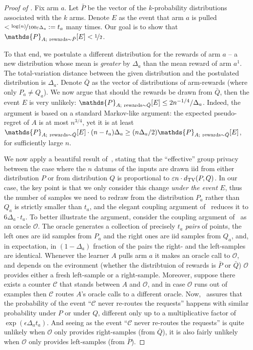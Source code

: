 \documentclass{article}
\renewcommand{\Pr}{\mathds{P}}
\begin{document}
\begin{proof}[Proof of ]
Fix arm $a$. Let $\bar P$ be the vector of the $k$-probability distributions associated with the $k$ arms. Denote $E$ as the event that arm $a$ is pulled $<\nicefrac{\log(n)}{100\varepsilon\Delta_a} := t_a$ many times. Our goal is to show that $\Pr_{A;~{\rm rewards}\sim \bar P}[E]<\nicefrac 1 2$.

To that end, we postulate a different distribution for the rewards of
arm $a$ -- a new distribution whose mean is \emph{greater} by
$\Delta_a$ than the mean reward of arm $a^1$. The total-variation
distance between the given distribution and the postulated
distribution is $\Delta_a$. Denote $\bar Q$ as the vector of
distributions of arm-rewards (where only $P_a \neq Q_a$). We now argue
that should the rewards be drawn from $\bar Q$, then the event $E$ is
very unlikely: $\Pr_{A;~{\rm rewards}\sim \bar Q}[E] \leq 2n^{-1/4}/\Delta_a$. Indeed, the argument is based on a standard Markov-like argument: the expected pseudo-regret of $A$ is at most $n^{3/4}$, yet it is at least $\Pr_{A;~{\rm rewards}\sim \bar Q}[E]\cdot (n-t_a) \Delta_a \geq  (n\Delta_a/2)\Pr_{A;~{\rm rewards}\sim \bar Q}[E]$, for sufficiently large $n$.


We now apply a beautiful result of~\citet[Lemma~6.1]{KarwaVadhanFiniteSampleDP2017}, stating that the ``effective'' group privacy between the case where the $n$ datums of the inputs are drawn iid from either distribution $P$ or from distribution $Q$ is proportional to $\varepsilon n\cdot d_{\rm TV}(P,Q)$. In our case, the key point is that we only consider this change \emph{under the event $E$}, thus the number of samples we need to redraw from the distribution $P_a$ rather than $Q_a$ is strictly smaller than $t_a$, and the elegant coupling argument of~\cite{KarwaVadhanFiniteSampleDP2017} reduces it to $6\Delta_a \cdot t_a$. To better illustrate the argument, consider the coupling argument of~\cite{KarwaVadhanFiniteSampleDP2017} as an oracle $\mathcal{O}$. The oracle generates a collection of precisely $t_a$ \emph{pairs} of points, the left ones are iid samples from $P_a$ and the right ones are iid samples from $Q_a$, and, in expectation, in $(1-\Delta_a)$ fraction of the pairs the right- and the left-samples are identical. Whenever the learner $A$ pulls arm $a$ it makes an oracle call to $\mathcal{O}$, and depends on the evironment (whether the distribtuion of rewards is $\bar P$ or $\bar Q$) $\mathcal{O}$ provides either a fresh left-sample or a right-sample. Moreover, suppose there exists a counter $\mathcal{C}$ that stands between $A$ and $\mathcal{O}$, and in case $\mathcal{O}$ runs out of examples then $\mathcal{C}$ routes $A$'s oracle calls to a different oracle. Now,~\citet[Lemma~6.1]{KarwaVadhanFiniteSampleDP2017} assures that the probability of the event ``$\mathcal{C}$ never re-routes the requests'' happens with similar probability under $P$ or under $Q$, different only up to a multiplicative factor of $\exp(\epsilon \Delta_a t_a)$. And seeing as the event ``$\mathcal{C}$ never re-routes the requests'' is quite unlikely when $\mathcal{O}$ only provides right-samples (from $\bar Q$), it is also fairly unlikely when $\mathcal{O}$ only provides left-samples (from $\bar P$).


\end{proof}
\end{document}
